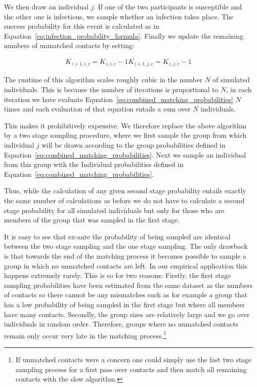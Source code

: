 We then draw an individual $j$. If one of the two participants is susceptible and the
other one is infectious, we sample whether an infection takes place. The success
probability for this event is calculated as in
Equation~\ref{eq:infection_probability_formula}. Finally we update the remaining
numbers of unmatched contacts by setting:

\begin{align}
    K_{z+1,i,c} = K_{z, i, c} - 1
    K_{z+1, j, c} = K_{z, j, c} - 1
\end{align}


The runtime of this algorithm scales roughly cubic in the number $N$ of simulated
individuals. This is because the number of iterations is proportional to $N$, in each
iteration we have evaluate Equation~\ref{eq:combined_matching_probabilities} $N$ times
and each evaluation of that equation entails a sum over $N$ individuals.

This makes it prohibitively expensive. We
therefore replace the above algorithm by a two stage sampling procedure, where we
first sample the group from which individual $j$ will be drawn according to the
group probabilities defined in Equation~\ref{eq:combined_matching_probabilities}.
Next we sample an individual from this group with the Individual probabilities defined
in Equation~\ref{eq:combined_matching_probabilities}.

Thus, while the calculation of any given second stage probability entails exactly the
same number of calculations as before we do not have to calculate a second stage
probability for all simulated individuals but only for those who are members of
the group that was sampled in the first stage.

It is easy to see that ex-ante the probability of being sampled are identical between
the two stage sampling and the one stage sampling. The only drawback is
that towards the end of the matching process it becomes possible to sample a group in
which no unmatched contacts are left. In our empirical application this happens
extremely rarely. This is so for two reasons: Firstly, the first stage sampling
probabilities have been estimated from the same dataset as the numbers of contacts so
there cannot be any mismatches such as for example a group that has a low probability
of being sampled in the first stage but where all members have many contacts.
Secondly, the group sizes are relatively large and we go over individuals in random
order. Therefore, groups where no unmatched contacts remain only occur very late in the
matching process.\footnote{If unmatched contacts were a concern one could simply
use the fast two stage sampling process for a first pass over contacts and then
match all remaining contacts with the slow algorithm.}




